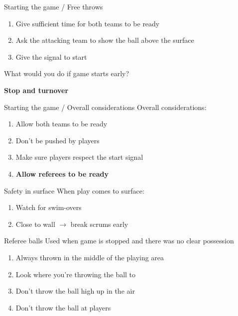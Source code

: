 \begin{frame}{Starting the game / Free throws}
    \begin{enumerate}
        \item Give sufficient time for both teams to be ready
        \item Ask the attacking team to show the ball above the surface
        \item Give the signal to start
    \end{enumerate}

    \pause{}

    \begin{center}
        What would you do if game starts early? \pause{}

        \textbf{Stop and turnover}
    \end{center}
\end{frame}

\begin{frame}{Starting the game / Overall considerations}
    Overall considerations:

    \begin{enumerate}
        \item Allow both teams to be ready
        \item Don't be pushed by players
        \item Make sure players respect the start signal
        \item \textbf{Allow referees to be ready}
    \end{enumerate}
\end{frame}

\begin{frame}{Safety in surface}
    When play comes to surface:

    \begin{enumerate}
        \item Watch for swim-overs
        \item Close to wall $\rightarrow$ break scrums early
    \end{enumerate}
\end{frame}

\begin{frame}{Referee balls}
    Used when game is stopped and there was no clear possession

    \pause{}

    \begin{enumerate}
        \item Always thrown in the middle of the playing area
        \item Look where you're throwing the ball to
        \item Don't throw the ball high up in the air
        \item Don't throw the ball at players
    \end{enumerate}
\end{frame}